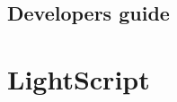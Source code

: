 \documentclass[11pt]{report}
\begin{document}
  \chapter{Developers guide}
\part{LightScript}

%
%

%
%


\end{document}
